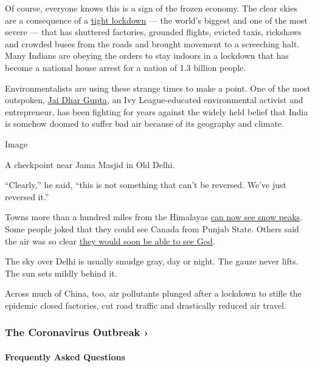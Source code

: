 Of course, everyone knows this is a sign of the frozen economy. The
clear skies are a consequence of a
\href{https://www.nytimes.com/2020/03/24/world/asia/india-coronavirus-lockdown.html}{tight
lockdown} --- the world's biggest and one of the most severe --- that
has shuttered factories, grounded flights, evicted taxis, rickshaws and
crowded buses from the roads and brought movement to a screeching halt.
Many Indians are obeying the orders to stay indoors in a lockdown that
has become a national house arrest for a nation of 1.3 billion people.

Environmentalists are using these strange times to make a point. One of
the most outspoken, \href{https://nirvanabeing.com/why-us/}{Jai Dhar
Gupta}, an Ivy League-educated environmental activist and entrepreneur,
has been fighting for years against the widely held belief that India is
somehow doomed to suffer bad air because of its geography and climate.

Image

A checkpoint near Jama Masjid in Old Delhi.

``Clearly,'' he said, ``this is not something that can't be reversed.
We've just reversed it.''

Towns more than a hundred miles from the Himalayas
\href{https://m.timesofindia.com/city/ludhiana/from-jalandhar-rooftops-dhauladhar-in-full-glory/articleshow/74975862.cms}{can
now see snow peaks}. Some people joked that they could see Canada from
Punjab State. Others said the air was so clear
\href{https://twitter.com/deepscribble/status/1246773230422994945}{they
would soon be able to see God}.

The sky over Delhi is usually smudge gray, day or night. The gauze never
lifts. The sun sets mildly behind it.

Across much of China, too, air pollutants plunged after a lockdown to
stifle the epidemic closed factories, cut road traffic and drastically
reduced air travel.

\href{https://www.nytimes.com/news-event/coronavirus?action=click\&pgtype=Article\&state=default\&region=MAIN_CONTENT_3\&context=storylines_faq}{}

\hypertarget{the-coronavirus-outbreak-}{%
\subsubsection{The Coronavirus Outbreak
›}\label{the-coronavirus-outbreak-}}

\hypertarget{frequently-asked-questions}{%
\paragraph{Frequently Asked
Questions}\label{frequently-asked-questions}}

